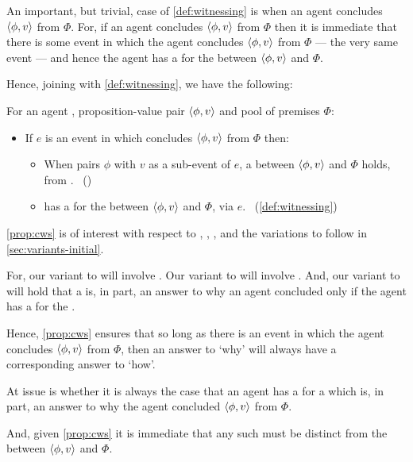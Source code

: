 \begin{note}
  An important, but trivial, case of \autoref{def:witnessing} is when an agent concludes \(\langle \phi, v \rangle\) from \(\Phi\).
  For, if an agent concludes \(\langle \phi, v \rangle\) from \(\Phi\) then it is immediate that there is some event in which the agent concludes \(\langle \phi, v \rangle\) from \(\Phi\) --- the very same event --- and hence the agent has a \wit{} for the \ros{} between \(\langle \phi, v \rangle\) and \(\Phi\).

  Hence, joining \supportI{} with \autoref{def:witnessing}, we have the following:

  \begin{proposition}
    \label{prop:cws}
    For an agent \vAgent{}, proposition-value pair \(\langle \phi, v \rangle\) and pool of premises \(\Phi\):
    \begin{itemize}
    \item
      If \(e\) is an event in which \vAgent{} concludes \(\langle \phi, v \rangle\) from \(\Phi\) then:
      \begin{itemize}
      \item
        When \vAgent{} pairs \(\phi\) with \(v\) as a sub-event of \(e\), a \ros{} between \(\langle \phi, v \rangle\) and \(\Phi\) holds, from .%
        \mbox{ }\hfill(\supportI{})
      \item
        \vAgent{} has a \wit{} for the \ros{} between \(\langle \phi, v \rangle\) and \(\Phi\), via \(e\).%
        \mbox{ }\hfill(\autoref{def:witnessing})
      \end{itemize}
    \end{itemize}
    \vspace{-\baselineskip}
  \end{proposition}

  \autoref{prop:cws} is of interest with respect to \qWhy{}, \qHow{}, \issueInclusion{}, and the variations to follow in \autoref{sec:variants-initial}.

  For, our variant to \qWhy{} will involve .
  Our variant to \qHow{} will involve .
  And, our variant to \issueInclusion{} will hold that a \ros{} is, in part, an answer to why an agent concluded only if the agent has a \wit{} for the \ros{}.

  Hence, \autoref{prop:cws} ensures that so long as there is an event in which the agent concludes \(\langle \phi, v \rangle\) from \(\Phi\), then an answer to `why' will always have a corresponding answer to `how'.

  At issue is whether it is always the case that an agent has a \wit{} for a \ros{} which is, in part, an answer to why the agent concluded \(\langle \phi, v \rangle\) from \(\Phi\).

  And, given \autoref{prop:cws} it is immediate that any such \ros{} must be distinct from the \ros{} between \(\langle \phi, v \rangle\) and \(\Phi\).
\end{note}

